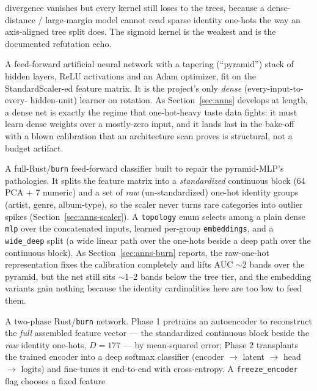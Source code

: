 \documentclass[11pt]{article}
\begin{document}
\begin{description}
  divergence vanishes but every kernel still loses to the trees, because a
  dense-distance / large-margin model cannot read sparse identity one-hots the
  way an axis-aligned tree split does. The sigmoid kernel is the weakest and is
  the documented refutation echo.
  \item[Pyramid-MLP (\texttt{pyramid-mlp-classifier}).] A feed-forward
  artificial neural network with a tapering (``pyramid'') stack of hidden
  layers, ReLU activations and an Adam optimizer, fit on the StandardScaler-ed
  feature matrix. It is the project's only \emph{dense} (every-input-to-every-
  hidden-unit) learner on rotation. As Section~\ref{sec:anns} develops at
  length, a dense net is exactly the regime that one-hot-heavy taste data
  fights: it must learn dense weights over a mostly-zero input, and it lands
  last in the bake-off with a blown calibration that an architecture scan
  proves is structural, not a budget artifact.
  \item[Representation-aware net (\texttt{burn-deep-classifier}).] A
  full-Rust/\texttt{burn} feed-forward classifier built to repair the
  pyramid-MLP's pathologies. It splits the feature matrix into a
  \emph{standardized} continuous block (64 PCA $+$ 7 numeric) and a set of
  \emph{raw} (un-standardized) one-hot identity groups (artist, genre,
  album-type), so the scaler never turns rare categories into outlier spikes
  (Section~\ref{sec:anns-scaler}). A \texttt{topology} enum selects among a
  plain dense \texttt{mlp} over the concatenated inputs, learned per-group
  \texttt{embeddings}, and a \texttt{wide\_deep} split (a wide linear path over
  the one-hots beside a deep path over the continuous block). As
  Section~\ref{sec:anns-burn} reports, the raw-one-hot representation fixes the
  calibration completely and lifts AUC $\sim$2 bands over the pyramid, but the
  net still sits $\sim$1--2 bands below the tree tier, and the embedding
  variants gain nothing because the identity cardinalities here are too low to
  feed them.
  \item[AE-transplant net (\texttt{burn-ae-classifier}).] A two-phase
  Rust/\texttt{burn} network. Phase 1 pretrains an autoencoder to reconstruct
  the \emph{full} assembled feature vector --- the standardized continuous
  block beside the \emph{raw} identity one-hots, $D{=}177$ --- by mean-squared
  error; Phase 2 transplants the trained encoder into a deep softmax classifier
  (encoder $\to$ latent $\to$ head $\to$ logits) and fine-tunes it end-to-end
  with cross-entropy. A \texttt{freeze\_encoder} flag chooses a fixed feature

\end{description}
\end{document}
